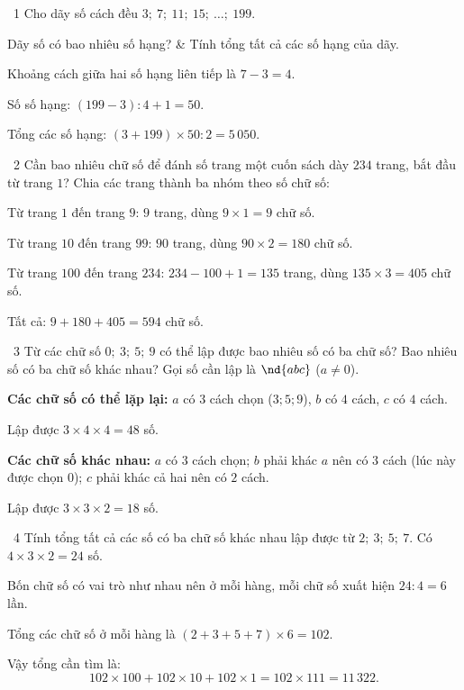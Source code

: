\gap
\begin{exbox}{\ExWord\ 1}
Cho dãy số cách đều $3;\ 7;\ 11;\ 15;\ \dots;\ 199$.
\begin{cols2}
 Dãy số có bao nhiêu số hạng? &  Tính tổng tất cả các số hạng của dãy.
\end{cols2}
\guide
Khoảng cách giữa hai số hạng liên tiếp là $7-3=4$.\par
{} Số số hạng: $(199-3):4+1=50$.\par
{} Tổng các số hạng: $(3+199)\times50:2=5\,050$.
\end{exbox}
\gap
\begin{exbox}{\ExWord\ 2}
Cần bao nhiêu chữ số để đánh số trang một cuốn sách dày $234$ trang, bắt đầu từ trang $1$?
\guide
Chia các trang thành ba nhóm theo số chữ số:\par
Từ trang $1$ đến trang $9$: $9$ trang, dùng $9\times1=9$ chữ số.\par
Từ trang $10$ đến trang $99$: $90$ trang, dùng $90\times2=180$ chữ số.\par
Từ trang $100$ đến trang $234$: $234-100+1=135$ trang, dùng $135\times3=405$ chữ số.\par
Tất cả: $9+180+405=594$ chữ số.
\end{exbox}
\gap
\begin{exbox}{\ExWord\ 3}
Từ các chữ số $0;\ 3;\ 5;\ 9$ có thể lập được bao nhiêu số có ba chữ số? Bao nhiêu số có ba chữ số khác nhau?
\guide
Gọi số cần lập là $\nd{abc}$ ($a\ne0$).\par
\textbf{Các chữ số có thể lặp lại:} $a$ có $3$ cách chọn ($3;5;9$), $b$ có $4$ cách, $c$ có $4$ cách.\par Lập được $3\times4\times4=48$ số.\par
\textbf{Các chữ số khác nhau:} $a$ có $3$ cách chọn; $b$ phải khác $a$ nên có $3$ cách (lúc này được chọn $0$); $c$ phải khác cả hai nên có $2$ cách.\par Lập được $3\times3\times2=18$ số.
\end{exbox}
\gap
\begin{exbox}{\ExWord\ 4}
Tính tổng tất cả các số có ba chữ số khác nhau lập được từ $2;\ 3;\ 5;\ 7$.
\guide
Có $4\times3\times2=24$ số.\par Bốn chữ số có vai trò như nhau nên ở mỗi hàng, mỗi chữ số xuất hiện $24:4=6$ lần.\par
Tổng các chữ số ở mỗi hàng là $(2+3+5+7)\times6=102$.\par Vậy tổng cần tìm là:
\[102\times100+102\times10+102\times1=102\times111=11\,322.\]
\end{exbox}
